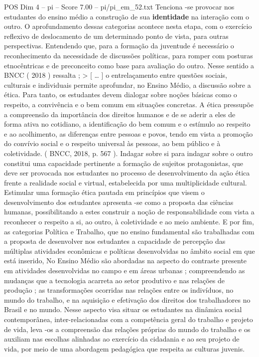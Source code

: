 \begin{textsample}{POS Dim 4 – pi – Score 7.00 – pi/pi\_em\_52.txt}
Tenciona -se provocar nos estudantes do ensino médio a construção de sua \textbf{identidade} na interação com o outro.
O aprofundamento dessas categorias acontece nesta etapa, com o exercício reflexivo de deslocamento de um determinado ponto de vista, para outras perspectivas.
Entendendo que, para a formação da juventude é necessário o reconhecimento da necessidade de discussões políticas, para romper com posturas etnocêntricas e de preconceito como base para avaliação do outro.
Nesse sentido a BNCC ( 2018 ) ressalta ; > [ … ] o entrelaçamento entre questões sociais, culturais e individuais permite aprofundar, no Ensino Médio, a discussão sobre a ética.
Para tanto, os estudantes devem dialogar sobre noções básicas como o respeito, a convivência e o bem comum em situações concretas.
A ética pressupõe a compreensão da importância dos direitos humanos e de se aderir a eles de forma ativa no cotidiano, a identificação do bem comum e o estímulo ao respeito e ao acolhimento, as diferenças entre pessoas e povos, tendo em vista a promoção do convívio social e o respeito universal às pessoas, ao bem público e à coletividade. ( BNCC, 2018, p. 567 ).
Indagar sobre si para indagar sobre o outro constitui uma capacidade pertinente a formação de sujeitos protagonistas, que deve ser provocada nos estudantes no processo de desenvolvimento da ação ética frente a realidade social e virtual, estabelecida por uma multiplicidade cultural.
Estimular uma formação ética pautada em princípios que visem o desenvolvimento dos estudantes apresenta -se como a proposta das ciências humanas, possibilitando a estes construir a noção de responsabilidade com vista a reconhecer o respeito a si, ao outro, à coletividade e ao meio ambiente.
E por fim, as categorias Política e Trabalho, que no ensino fundamental são trabalhadas com a proposta de desenvolver nos estudantes a capacidade de percepção das múltiplas atividades econômicas e políticas desenvolvidas no âmbito social em que está inserido, No Ensino Médio são abordadas na aspecto do contraste presente em atividades desenvolvidas no campo e em áreas urbanas ; compreendendo as mudanças que a tecnologia acarreta ao setor produtivo e nas relações de produção ; as transformações ocorridas nas relações entre os indivíduos, no mundo do trabalho, e na aquisição e efetivação dos direitos dos trabalhadores no Brasil e no mundo.
Nesse aspecto visa situar os estudantes na dinâmica social contemporânea, inter-relacionadas com a competência geral do trabalho e projeto de vida, leva -os a compreensão das relações próprias do mundo do trabalho e os auxiliam nas escolhas alinhadas ao exercício da cidadania e ao seu projeto de vida, por meio de uma abordagem pedagógica que respeita as culturas juvenis.

\end{textsample}
